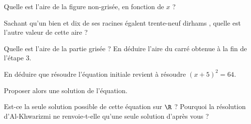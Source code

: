 \documentclass{article}
\begin{document}
\begin{enumquestions}
\item Quelle est l'aire de la figure non-grisée, en fonction de $x$ ?
\item Sachant qu'un \og bien et dix de ses racines égalent trente-neuf dirhams \fg, quelle est l'autre valeur de cette aire ?
\item Quelle est l'aire de la partie grisée ? En déduire l'aire du carré obtenue à la fin de l'étape $3$.
\item En déduire que résoudre l'équation initiale revient à résoudre $(x+5)^2 = 64$.
\item Proposer alors une solution de l'équation.
\item Est-ce la seule solution possible de cette équation sur $\R$ ? Pourquoi la résolution d'Al-Khwarizmi ne renvoie-t-elle qu'une seule solution d'après vous ?
\end{enumquestions}
\end{document}
